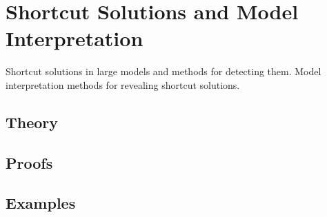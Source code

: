
\section{Shortcut Solutions and Model Interpretation}
\label{sec:2.5.03-shortcut-solutions}

\begin{ticket}
Shortcut solutions in large models and methods for detecting them. Model interpretation methods for revealing shortcut solutions.
\end{ticket}

\subsection*{Theory}

\subsection*{Proofs}

\subsection*{Examples}
